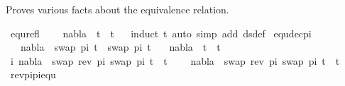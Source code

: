 %
\begin{isabellebody}%
%
%
\isadelimtheory
%
\endisadelimtheory
%
\isatagtheory
%
\endisatagtheory
{\isafoldtheory}%
%
\isadelimtheory
%
\endisadelimtheory
%
\isadelimdocument
%
\endisadelimdocument
%
\isatagdocument
%
\isamarkuptrue%
%
\endisatagdocument
{\isafolddocument}%
%
\isadelimdocument
%
\endisadelimdocument
%
\begin{isamarkuptext}%
Proves various facts about the equivalence relation.%
\end{isamarkuptext}\isamarkuptrue%
\isamarkupfalse%
\ equ{\isacharunderscore}{\kern0pt}refl{\isacharcolon}{\kern0pt}\ \isanewline
\ \ \ {\isachardoublequoteopen}nabla\ {\isasymturnstile}\ t\ {\isasymapprox}\ t{\isachardoublequoteclose}\isanewline
%
\isadelimproof
\ \ %
\endisadelimproof
%
\isatagproof
{}\isamarkupfalse%
{\isacharparenleft}{\kern0pt}induct\ t{\isacharcomma}{\kern0pt}\ auto\ simp\ add{\isacharcolon}{\kern0pt}\ ds{\isacharunderscore}{\kern0pt}def{\isacharparenright}{\kern0pt}%
\endisatagproof
{\isafoldproof}%
%
\isadelimproof
\isanewline
%
\endisadelimproof
\isanewline
\isanewline
{}\isamarkupfalse%
\ equ{\isacharunderscore}{\kern0pt}dec{\isacharunderscore}{\kern0pt}pi{\isacharcolon}{\kern0pt}\isanewline
\ \ \ {\isachardoublequoteopen}nabla\ {\isasymturnstile}\ swap\ pi\ t{}\ {\isasymapprox}\ swap\ pi\ t{}{\isachardoublequoteclose}\isanewline
\ \ \ {\isachardoublequoteopen}nabla\ {\isasymturnstile}\ t{}\ {\isasymapprox}\ t{}{\isachardoublequoteclose}\isanewline
%
\isadelimproof
%
\endisadelimproof
%
\isatagproof
{}\isamarkupfalse%
{\isacharminus}{\kern0pt}\isanewline
\ \ \isamarkupfalse%
\ i{\isacharcolon}{\kern0pt}\ {\isachardoublequoteopen}nabla\ {\isasymturnstile}\ swap\ {\isacharparenleft}{\kern0pt}rev\ pi{\isacharparenright}{\kern0pt}\ {\isacharparenleft}{\kern0pt}swap\ pi\ t{}{\isacharparenright}{\kern0pt}\ {\isasymapprox}\ t{}{\isachardoublequoteclose}\isanewline
\ \ \ \ {\isachardoublequoteopen}nabla\ {\isasymturnstile}\ swap\ {\isacharparenleft}{\kern0pt}rev\ pi{\isacharparenright}{\kern0pt}\ {\isacharparenleft}{\kern0pt}swap\ pi\ t{}{\isacharparenright}{\kern0pt}\ {\isasymapprox}\ t{}{\isachardoublequoteclose}\isanewline
\ \ \ \ \isamarkupfalse%
\ rev{\isacharunderscore}{\kern0pt}pi{\isacharunderscore}{\kern0pt}pi{\isacharunderscore}{\kern0pt}equ\ \isamarkupfalse%

\end{isabellebody}
